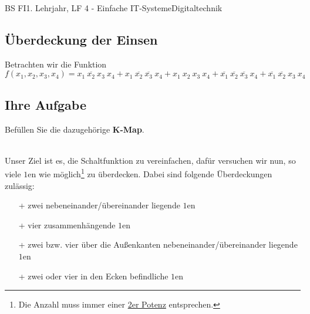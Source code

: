 \documentclass[11pt,twocolumn,oneside,openany,headings=optiontotoc,11pt,numbers=noenddot]{article}
\begin{document}
\begin{worksheet}{BS FI}{1. Lehrjahr, LF 4 - Einfache IT-Systeme}{Digitaltechnik}
		\subsection{Überdeckung der Einsen} Betrachten wir die Funktion\\
		\(f(x_1,x_2,x_3,x_4) = x_1\ \overline{x_2}\ x_3\ x_4 + x_1\ \overline{x_2}\ \overline{x_3}\ x_4 + x_1\ x_2\ x_3\ x_4 + \overline{x_1}\ \overline{x_2}\ \overline{x_3}\ x_4 + \overline{x_1}\ \overline{x_2}\ x_3\ x_4\)
		\subsection*{Ihre Aufgabe} Befüllen Sie die dazugehörige \textbf{K-Map}.
		\begin{karnaugh-map}[4][4][1][$x_3x_4$][$x_1x_2$]
			
		\end{karnaugh-map}\\
		Unser Ziel ist es, die Schaltfunktion zu vereinfachen, dafür versuchen wir nun, so viele \(1\)en wie möglich\footnote{Die Anzahl muss immer einer \underline{2er Potenz} entsprechen.} zu überdecken. Dabei sind folgende Überdeckungen zulässig:
		\begin{itemize}
			\item[+] zwei nebeneinander/übereinander liegende \(1\)en
			\item[+] vier zusammenhängende \(1\)en
			\item[+] zwei bzw. vier über die Außenkanten nebeneinander/übereinander liegende \(1\)en
			\item[+] zwei oder vier in den Ecken befindliche \(1\)en
		\end{itemize}
		\begin{karnaugh-map}[4][4][1][$x_2x_1$][$x_4x_3$]
		\end{karnaugh-map}
		\begin{karnaugh-map}[4][4][1][$x_2x_1$][$x_4x_3$]
		\end{karnaugh-map}
		\begin{karnaugh-map}[4][4][1][$x_2x_1$][$x_4x_3$]
		\end{karnaugh-map}
		\begin{karnaugh-map}[4][4][1][$x_2x_1$][$x_4x_3$]
		\end{karnaugh-map}
		\begin{karnaugh-map}[4][4][1][$x_2x_1$][$x_4x_3$]
			\implicantcorner
		\end{karnaugh-map}

\end{worksheet}
\end{document}
